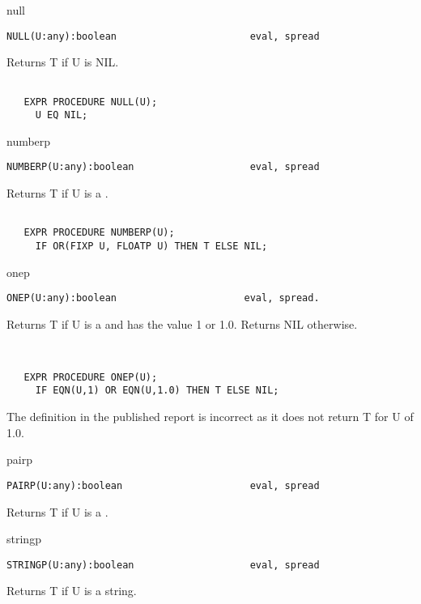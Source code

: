 \begin{Function}{null}
\begin{verbatim}
NULL(U:any):boolean                       eval, spread
\end{verbatim}
   Returns T if U is NIL.
\begin{verbatim}

   EXPR PROCEDURE NULL(U);
     U EQ NIL;
\end{verbatim}
\end{Function}
\begin{Function}{numberp}
\begin{verbatim}
NUMBERP(U:any):boolean                    eval, spread
\end{verbatim}
   Returns T if U is a .
\begin{verbatim}

   EXPR PROCEDURE NUMBERP(U);
     IF OR(FIXP U, FLOATP U) THEN T ELSE NIL;
\end{verbatim}
\end{Function}
\begin{Function}{onep}
\begin{verbatim}
ONEP(U:any):boolean                      eval, spread.
\end{verbatim}
   Returns  T  if U  is a    and has  the  value 1  or 1.0.
   Returns NIL otherwise.
\begin{verbatim}


   EXPR PROCEDURE ONEP(U);
     IF EQN(U,1) OR EQN(U,1.0) THEN T ELSE NIL;
\end{verbatim} 
     The  definition in the  published report is  incorrect as it
   does not return T for U of 1.0.

\end{Function}
\begin{Function}{pairp}
\begin{verbatim}
PAIRP(U:any):boolean                      eval, spread
\end{verbatim}
   Returns T if U is a .

\end{Function}
\begin{Function}{stringp}
\begin{verbatim}
STRINGP(U:any):boolean                    eval, spread
\end{verbatim}
   Returns T if U is a string.

\end{Function}
